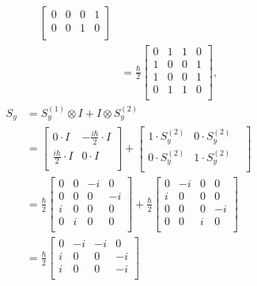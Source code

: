 \begin{example}
\begin{enumerate}
\begin{equation}
\begin{split}
\begin{bmatrix}
					0 & 0 & 0 & 1 \\
					0 & 0 & 1 & 0 \\
				\end{bmatrix}\\
				&=\frac{\hbar}{2}\begin{bmatrix}
					0 & 1 & 1 & 0 \\
					1 & 0 & 0 & 1 \\
					1 & 0 & 0 & 1 \\
					0 & 1 & 1 & 0 \\
				\end{bmatrix},
			\end{split}
		\end{equation}
		\begin{equation}
			\begin{split}
				S_y&=S^{(1)}_y \otimes I +I\otimes S^{(2)}_y\\
				&=\begin{bmatrix}
					0\cdot I & -\frac{i\hbar}{2}\cdot I \\
					\frac{i\hbar}{2}\cdot I & 0\cdot I\\
				\end{bmatrix}+\begin{bmatrix}
					1\cdot S^{(2)}_y & 0\cdot S^{(2)}_y & \\
					0\cdot S^{(2)}_y & 1\cdot S^{(2)}_y\\
				\end{bmatrix}\\
				&=\frac{\hbar}{2}\begin{bmatrix}
					0 & 0 & -i & 0 \\
					0 & 0 & 0 & -i \\
					i & 0 & 0 & 0 \\
					0 & i & 0 & 0 \\
				\end{bmatrix}+\frac{\hbar}{2}\begin{bmatrix}
					0 & -i & 0 & 0 \\
					i & 0 & 0 & 0 \\
					0 & 0 & 0 & -i \\
					0 & 0 & i & 0 \\
				\end{bmatrix}\\
				&=\frac{\hbar}{2}\begin{bmatrix}
					0 & -i & -i & 0 \\
					i & 0 & 0 & -i \\
					i & 0 & 0 & -i \\

\end{bmatrix}
\end{split}
\end{equation}
\end{enumerate}
\end{example}
